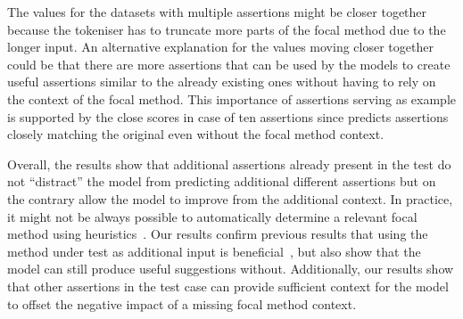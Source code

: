 The values for the datasets with multiple assertions might be closer
together because the tokeniser has to truncate more parts of the focal
method due to the longer input.
An alternative explanation for the values moving closer together could
be that there are more assertions that can be used by the models to
create useful assertions similar to the already existing ones without
having to rely on the context of the focal method.
This importance of assertions serving as example is supported by the
close \bleu scores in case of ten assertions since \temet predicts
assertions closely matching the original even without the focal method
context.

Overall, the results show that additional assertions already present
in the test do not \enquote{distract} the model from predicting
additional different assertions but on the contrary allow the model to
improve from the additional context.
In practice, it might not be always possible to automatically
determine a relevant focal method using
heuristics~\cite{He2024,Tufano2022a}. Our results confirm previous
results that using the method under test as additional input is
beneficial~\cite{Tufano2022}, but also show that the model can still
produce useful suggestions without.
Additionally, our results show that other assertions in the test case
can provide sufficient context for the model to offset the negative
impact of a missing focal method context.




